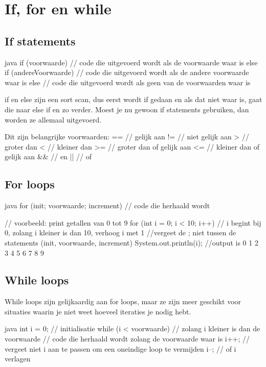 \documentclass[a4paper,11pt]{article}
\begin{document}
\section{If, for en while}
\subsection{If statements}
\begin{codeblock}[if statement]{java}
    if (voorwaarde) {
        // code die uitgevoerd wordt als de voorwaarde waar is
    } else if (andereVoorwaarde) {
        // code die uitgevoerd wordt als de andere voorwaarde waar is
    } else {
        // code die uitgevoerd wordt als geen van de voorwaarden waar is
    }

    if en else zijn een sort scan, dus eerst wordt if gedaan en als
    dat niet waar is, gaat die naar else if en zo verder.
    Moest je nu gewoon if statements gebruiken, dan worden ze allemaal
    uitgevoerd.

    Dit zijn belangrijke voorwaarden:
    ==  // gelijk aan
    !=  // niet gelijk aan
    >   // groter dan
    <   // kleiner dan
    >=  // groter dan of gelijk aan
    <=  // kleiner dan of gelijk aan
    &&  // en
    ||  // of
\end{codeblock}

\subsection{For loops}
\begin{codeblock}{java}
    for (init; voorwaarde; increment) {
        // code die herhaald wordt
    }

    // voorbeeld: print getallen van 0 tot 9
    for (int i = 0; i < 10; i++) // i begint bij 0, zolang i kleiner is dan 10, verhoog i met 1
    //vergeet de ; niet tussen de statements (init, voorwaarde, increment)
    {
        System.out.println(i); //output is 0 1 2 3 4 5 6 7 8 9
    }
\end{codeblock}

\subsection{While loops}
While loops zijn gelijkaardig aan for loops, maar ze zijn
meer geschikt voor situaties waarin je niet weet hoeveel iteraties je nodig hebt.
\begin{codeblock}{java}
    int i = 0; // initialisatie
    while (i < voorwaarde) // zolang i kleiner is dan de voorwaarde
     {
        // code die herhaald wordt zolang de voorwaarde waar is
        i++; // vergeet niet i aan te passen om een oneindige loop te vermijden
        i--; // of i verlagen
    }
\end{codeblock}
\end{document}

